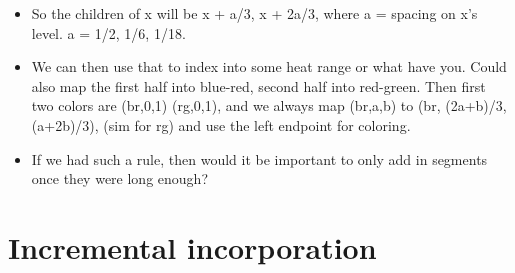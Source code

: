 \documentclass{book}
\begin{document}
\begin{itemize}
\item So the children of x will be x + a/3, x + 2a/3, where a = spacing
    on x's level. a = 1/2, 1/6, 1/18.
\item We can then use that to index into some heat range or what have
    you. Could also map the first half into blue-red, second half into
    red-green. Then first two colors are (br,0,1) (rg,0,1), and we
    always map (br,a,b) to (br, (2a+b)/3, (a+2b)/3), (sim for rg) and
    use the left endpoint for coloring.
\item If we had such a rule, then would it be important to only add in
    segments once they were long enough?
\end{itemize}
\section{Incremental incorporation}
\label{sec-5_3}
\end{document}
